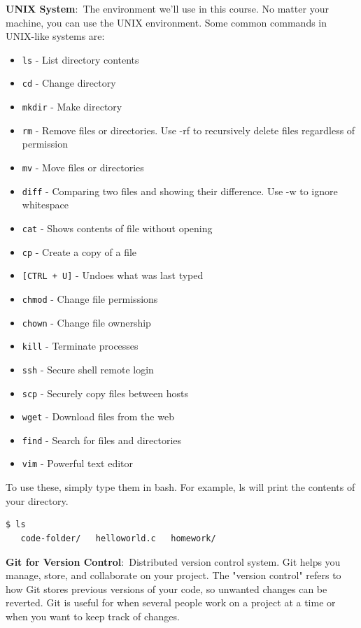 \documentclass[nobib]{tufte-handout}
\newcommand{\defn}[2]{\noindent\textbf{#1}:\ #2}
\begin{document}
\defn{UNIX System}{The environment we'll use in this course.}
No matter your machine, you can use the UNIX environment. 
Some common commands in UNIX-like systems are:
\begin{itemize}
   \item \texttt{ls} - List directory contents
   \item \texttt{cd} - Change directory
   \item \texttt{mkdir} - Make directory
   \item \texttt{rm} - Remove files or directories. Use -rf to recursively delete files regardless of permission
   \item \texttt{mv} - Move files or directories
   \item \texttt{diff} - Comparing two files and showing their difference. Use -w to ignore whitespace
   \item \texttt{cat} - Shows contents of file without opening
   \item \texttt{cp} - Create a copy of a file
   \item \texttt{[CTRL + U]} - Undoes what was last typed
   \item \texttt{chmod} - Change file permissions
   \item \texttt{chown} - Change file ownership
   \item \texttt{kill} - Terminate processes
   \item \texttt{ssh} - Secure shell remote login
   \item \texttt{scp} - Securely copy files between hosts
   \item \texttt{wget} - Download files from the web
   \item \texttt{find} - Search for files and directories
   \item \texttt{vim} - Powerful text editor
\end{itemize}

\noindent To use these, simply type them in bash. For example, ls
will print the contents of your directory. 

\begin{lstlisting}[language=bash,caption=Using ls]
   $ ls
   code-folder/   helloworld.c   homework/
\end{lstlisting}

\defn{Git for Version Control}{Distributed version control system.} Git 
helps you manage, store, and collaborate on your project. The 
"version control" refers to how Git stores previous versions
of your code, so unwanted changes can be reverted. Git is useful
for when several people work on a project at a time or when you want
to keep track of changes.  
\end{document}
